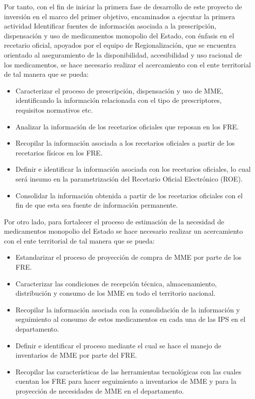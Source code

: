 \documentclass[
  oneside]{book}
\begin{document}
Por tanto, con el fin de iniciar la primera fase de desarrollo de este proyecto de inversión en el marco del primer objetivo, encaminados a ejecutar la primera actividad Identificar fuentes de información asociada a la prescripción, dispensación y uso de medicamentos monopolio del Estado, con énfasis en el recetario oficial, apoyados por el equipo de Regionalización, que se encuentra orientado al aseguramiento de la disponibilidad, accesibilidad y uso racional de los medicamentos, se hace necesario realizar el acercamiento con el ente territorial de tal manera que se pueda:

\begin{itemize}
\item
  Caracterizar el proceso de prescripción, dispensación y uso de MME, identificando la información relacionada con el tipo de prescriptores, requisitos normativos etc.
\item
  Analizar la información de los recetarios oficiales que reposan en los FRE.
\item
  Recopilar la información asociada a los recetarios oficiales a partir de los recetarios físicos en los FRE.
\item
  Definir e identificar la información asociada con los recetarios oficiales, lo cual será insumo en la parametrización del Recetario Oficial Electrónico (ROE).
\item
  Consolidar la información obtenida a partir de los recetarios oficiales con el fin de que esta sea fuente de información permanente.
\end{itemize}

Por otro lado, para fortalecer el proceso de estimación de la necesidad de medicamentos monopolio del Estado se hace necesario realizar un acercamiento con el ente territorial de tal manera que se pueda:

\begin{itemize}
\item
  Estandarizar el proceso de proyección de compra de MME por parte de los FRE.
\item
  Caracterizar las condiciones de recepción técnica, almacenamiento, distribución y consumo de los MME en todo el territorio nacional.
\item
  Recopilar la información asociada con la consolidación de la información y seguimiento al consumo de estos medicamentos en cada una de las IPS en el departamento.
\item
  Definir e identificar el proceso mediante el cual se hace el manejo de inventarios de MME por parte del FRE.
\item
  Recopilar las características de las herramientas tecnológicas con las cuales cuentan los FRE para hacer seguimiento a inventarios de MME y para la proyección de necesidades de MME en el departamento.
\end{itemize}
\end{document}
